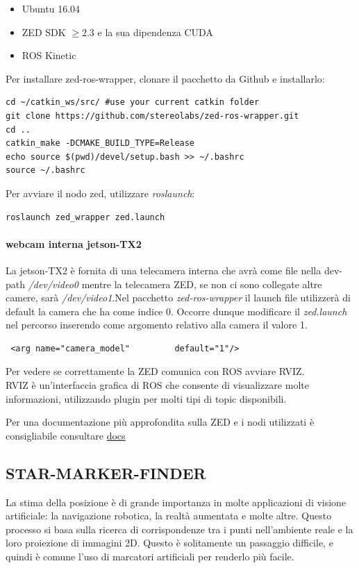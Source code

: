 \documentclass[a4paper]{article}
\begin{document}
\begin{itemize}
\item Ubuntu 16.04
\item ZED SDK $\ge 2.3 $   e la sua dipendenza CUDA
\item ROS Kinetic
\end{itemize}

Per installare zed-ros-wrapper, clonare il pacchetto da Github e installarlo:
\begin{verbatim}
cd ~/catkin_ws/src/ #use your current catkin folder
git clone https://github.com/stereolabs/zed-ros-wrapper.git
cd ..
catkin_make -DCMAKE_BUILD_TYPE=Release
echo source $(pwd)/devel/setup.bash >> ~/.bashrc
source ~/.bashrc
\end{verbatim}

Per avviare il nodo zed, utilizzare \textit{roslaunch}:
\begin{verbatim}
roslaunch zed_wrapper zed.launch
\end{verbatim}

\paragraph{webcam interna jetson-TX2}
La jetson-TX2 è fornita di una telecamera interna che avrà come file nella dev-path  \textit{/dev/video0} mentre la telecamera ZED, se non ci sono collegate altre camere, sarà \textit{/dev/video1}.Nel pacchetto \textit{zed-ros-wrapper} il launch file utilizzerà di default la camera che ha come indice 0. Occorre dunque modificare il \textit{zed.launch} nel percorso   inserendo come argomento relativo alla camera il valore 1.
\begin{verbatim}
 <arg name="camera_model"         default="1"/>
\end{verbatim}


Per vedere se correttamente la ZED comunica con ROS avviare RVIZ.
\\
RVIZ è un'interfaccia grafica di ROS che consente di visualizzare molte informazioni, utilizzando plugin per molti tipi di topic disponibili.





Per una documentazione più approfondita sulla ZED e i nodi utilizzati è consigliabile consultare 
\textcolor{red}{\href{https://www.stereolabs.com/docs/getting-started/}{docs}}

\subsection{STAR-MARKER-FINDER}
La stima della posizione è di grande importanza in molte applicazioni di visione artificiale: la navigazione robotica, la realtà aumentata e molte altre. Questo processo si basa sulla ricerca di corrispondenze tra i punti nell'ambiente reale e la loro proiezione di immagini 2D. Questo è solitamente un passaggio difficile, e quindi è comune l'uso di marcatori artificiali per renderlo più facile.
\end{document}
